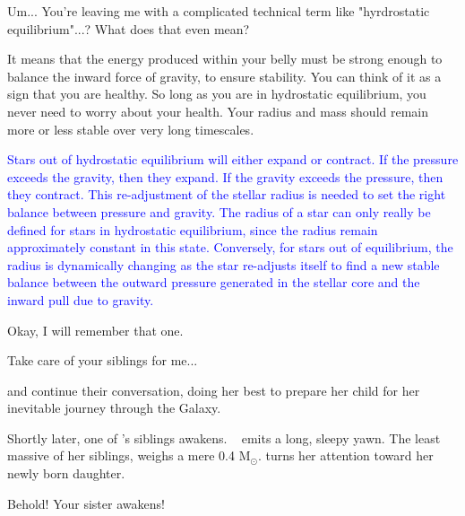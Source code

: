 \documentclass[main.tex]{subfiles}
\begin{document}
\par \Maia Um... You're leaving me with a complicated technical term like "hyrdrostatic equilibrium"...?  What does that even mean?

\par \Pleione It means that the energy produced within your belly must be strong enough to balance the inward force of gravity, to ensure stability.  You can think of it as a sign that you are healthy.  So long as you are in hydrostatic equilibrium, you never need to worry about your health.  Your radius and mass should remain more or less stable over very long timescales.

\begin{tcolorbox}[sharp corners, colback=blue!30, colframe=blue!80!blue, title=What determines the radius of a star?]
\par \textcolor{blue} {Stars out of hydrostatic equilibrium will either expand or contract.  If the pressure exceeds the gravity, then they expand.  If the gravity exceeds the pressure, then they contract.  This re-adjustment of the stellar radius is needed to set the right balance between pressure and gravity.  The radius of a star can only really be defined for stars in hydrostatic equilibrium, since the radius remain approximately constant in this state.  Conversely, for stars out of equilibrium, the radius is dynamically changing as the star re-adjusts itself to find a new stable balance between the outward pressure generated in the stellar core and the inward pull due to gravity.}
\end{tcolorbox}

\par \Maia Okay, I will remember that one.

\par \Pleione Take care of your siblings for me...

\par \nar \rmmaia and \rmpleione continue their conversation, \rmpleione doing her best to prepare her child for her inevitable journey through the Galaxy.  

\par \nar Shortly later, one of \rmmaia's siblings awakens.  \rmelectra~ emits a long, sleepy yawn.  The least massive of her siblings, \rmelectra weighs a mere 0.4 M$_{\odot}$.  \rmpleione turns her attention toward her newly born daughter.

\par \Pleione Behold!  Your sister awakens!
\end{document}
